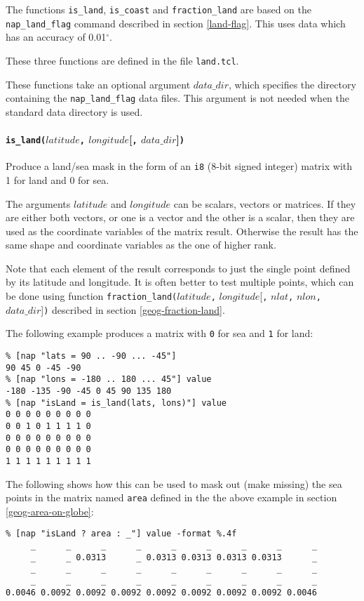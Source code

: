 The functions 
  \texttt{is\_land}, 
  \texttt{is\_coast} and 
  \texttt{fraction\_land} are based on the 
\texttt{nap\_land\_flag} command described in section \ref{land-flag}.
This uses data which has an accuracy of 0.01$^{\circ}$.
  
These three functions are defined in the file \texttt{land.tcl}.

These functions take an optional argument 
  $data\_dir$, which specifies the directory containing the 
  \texttt{nap\_land\_flag} data files. This argument is not needed
  when the standard data directory is used.

\paragraph{\texttt{is\_land(}$latitude$\texttt{,} $longitude$[\texttt{,} $data\_dir$]\texttt{)}\\}
    \label{geog-is-land}

Produce a land/sea mask in the form of an 
  \texttt{i8} (8-bit signed integer) matrix with 1 for land and 0
  for sea.
  
 The arguments 
  $latitude$ and 
  $longitude$ can be scalars, vectors or matrices. If they are
  either both vectors, or one is a vector and the other is a scalar,
  then they are used as the coordinate variables of the matrix result.
  Otherwise the result has the same shape and coordinate variables as
  the one of higher rank.
  
 Note that each element of the result corresponds to just the
  single point defined by its latitude and longitude. It is often
  better to test multiple points, which can be done using function 
\texttt{fraction\_land(}$latitude$\texttt{,}
$longitude$[\texttt{,} $nlat$\texttt{,} $nlon$\texttt{,} $data\_dir$]\texttt{)}
described in section \ref{geog-fraction-land}.
  
 The following example produces a matrix with 
  \texttt{0} for sea and 
  \texttt{1} for land:
  \begin{verbatim}
% [nap "lats = 90 .. -90 ... -45"]
90 45 0 -45 -90
% [nap "lons = -180 .. 180 ... 45"] value
-180 -135 -90 -45 0 45 90 135 180
% [nap "isLand = is_land(lats, lons)"] value
0 0 0 0 0 0 0 0 0
0 0 1 0 1 1 1 1 0
0 0 0 0 0 0 0 0 0
0 0 0 0 0 0 0 0 0
1 1 1 1 1 1 1 1 1
\end{verbatim}

The following shows how this can be used to mask out (make
missing) the sea points in the matrix named 
  \texttt{area} defined in the the above example 
in section \ref{geog-area-on-globe}:
  \begin{verbatim}
% [nap "isLand ? area : _"] value -format %.4f
     _      _      _      _      _      _      _      _      _
     _      _ 0.0313      _ 0.0313 0.0313 0.0313 0.0313      _
     _      _      _      _      _      _      _      _      _
     _      _      _      _      _      _      _      _      _
0.0046 0.0092 0.0092 0.0092 0.0092 0.0092 0.0092 0.0092 0.0046
\end{verbatim}

